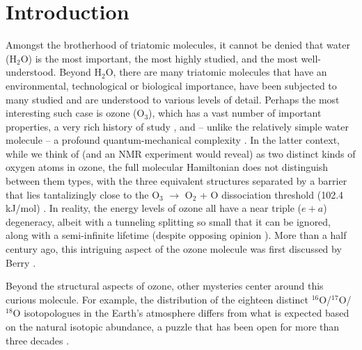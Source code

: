 \documentclass[
12pt,
a4paper,
prb,
superscriptaddress,
tightenlines,  %
]{revtex4}
\begin{document}
\maketitle

\section{Introduction}

Amongst the brotherhood of triatomic molecules, it cannot be denied that water
(H$_2$O) is the most important, the most highly studied, and the most
well-understood.  Beyond H$_2$O, there are many triatomic molecules that have
an environmental, technological or biological importance, have been subjected
to many studied and are understood to various levels of detail.  Perhaps the
most interesting such case is ozone (O$_3$), which has a vast number of
important properties, a very rich history of study \cite{chappuis}, and –
unlike the relatively simple water molecule – a profound quantum-mechanical
complexity \cite{Babikov:anomalousOzone:2003}.  In the latter context, while
we think of (and an NMR experiment would reveal) as two distinct kinds of
oxygen atoms in ozone, the full molecular Hamiltonian does not distinguish
between them types, with the three equivalent structures separated by a
barrier that lies tantalizingly close to the O$_3$ $\rightarrow$ O$_2$ + O
dissociation threshold (102.4 kJ/mol) \cite{Ruscis:ATcT:2022}. In reality, the
energy levels of ozone all have a near triple ($e+a$) degeneracy, albeit with
a tunneling splitting so small that it can be ignored, along with a
semi-infinite lifetime (despite opposing opinion
\cite{Boggs:BerryOzone:2006}).   More than a half century ago, this intriguing
aspect of the ozone molecule was first discussed by Berry
\cite{Berry:Ozone:1960}.

Beyond the structural aspects of ozone, other mysteries center around this
curious molecule.  For example, the distribution of the eighteen distinct
$^{16}$O/$^{17}$O/$^{18}$O isotopologues in the Earth's atmosphere differs
from what is expected based on the natural isotopic abundance, a puzzle that
has been open for more than three decades
\cite{Mauersberger:OzoneMystery:1990}. 
\end{document}
